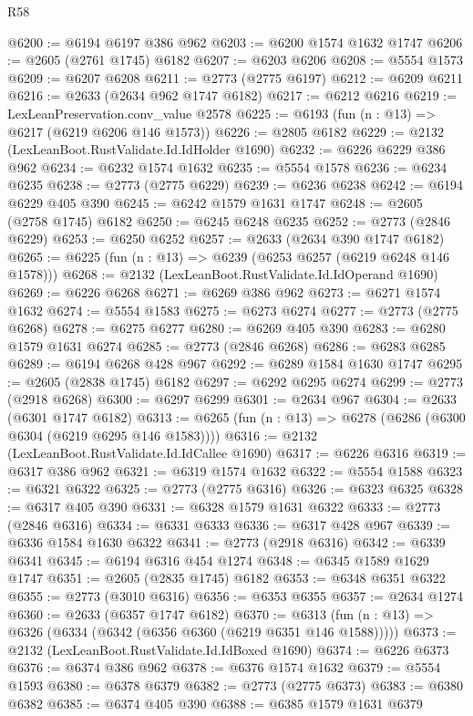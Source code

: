 \begin{lexlean}{R58}
\begin{coremodule}
@6200 := @6194 @6197 @386 @962
@6203 := @6200 @1574 @1632 @1747
@6206 := @2605 (@2761 @1745) @6182
@6207 := @6203 @6206
@6208 := @5554 @1573
@6209 := @6207 @6208
@6211 := @2773 (@2775 @6197)
@6212 := @6209 @6211
@6216 := @2633 (@2634 @962 @1747 @6182)
@6217 := @6212 @6216
@6219 := LexLeanPreservation.conv_value @2578
@6225 := @6193 (fun (n : @13) => @6217 (@6219 @6206 @146 @1573))
@6226 := @2805 @6182
@6229 := @2132 (LexLeanBoot.RustValidate.Id.IdHolder @1690)
@6232 := @6226 @6229 @386 @962
@6234 := @6232 @1574 @1632
@6235 := @5554 @1578
@6236 := @6234 @6235
@6238 := @2773 (@2775 @6229)
@6239 := @6236 @6238
@6242 := @6194 @6229 @405 @390
@6245 := @6242 @1579 @1631 @1747
@6248 := @2605 (@2758 @1745) @6182
@6250 := @6245 @6248 @6235
@6252 := @2773 (@2846 @6229)
@6253 := @6250 @6252
@6257 := @2633 (@2634 @390 @1747 @6182)
@6265 := @6225 (fun (n : @13) => @6239 (@6253 @6257 (@6219 @6248 @146 @1578)))
@6268 := @2132 (LexLeanBoot.RustValidate.Id.IdOperand @1690)
@6269 := @6226 @6268
@6271 := @6269 @386 @962
@6273 := @6271 @1574 @1632
@6274 := @5554 @1583
@6275 := @6273 @6274
@6277 := @2773 (@2775 @6268)
@6278 := @6275 @6277
@6280 := @6269 @405 @390
@6283 := @6280 @1579 @1631 @6274
@6285 := @2773 (@2846 @6268)
@6286 := @6283 @6285
@6289 := @6194 @6268 @428 @967
@6292 := @6289 @1584 @1630 @1747
@6295 := @2605 (@2838 @1745) @6182
@6297 := @6292 @6295 @6274
@6299 := @2773 (@2918 @6268)
@6300 := @6297 @6299
@6301 := @2634 @967
@6304 := @2633 (@6301 @1747 @6182)
@6313 := @6265 (fun (n : @13) => @6278 (@6286 (@6300 @6304 (@6219 @6295 @146 @1583))))
@6316 := @2132 (LexLeanBoot.RustValidate.Id.IdCallee @1690)
@6317 := @6226 @6316
@6319 := @6317 @386 @962
@6321 := @6319 @1574 @1632
@6322 := @5554 @1588
@6323 := @6321 @6322
@6325 := @2773 (@2775 @6316)
@6326 := @6323 @6325
@6328 := @6317 @405 @390
@6331 := @6328 @1579 @1631 @6322
@6333 := @2773 (@2846 @6316)
@6334 := @6331 @6333
@6336 := @6317 @428 @967
@6339 := @6336 @1584 @1630 @6322
@6341 := @2773 (@2918 @6316)
@6342 := @6339 @6341
@6345 := @6194 @6316 @454 @1274
@6348 := @6345 @1589 @1629 @1747
@6351 := @2605 (@2835 @1745) @6182
@6353 := @6348 @6351 @6322
@6355 := @2773 (@3010 @6316)
@6356 := @6353 @6355
@6357 := @2634 @1274
@6360 := @2633 (@6357 @1747 @6182)
@6370 := @6313 (fun (n : @13) => @6326 (@6334 (@6342 (@6356 @6360 (@6219 @6351 @146 @1588)))))
@6373 := @2132 (LexLeanBoot.RustValidate.Id.IdBoxed @1690)
@6374 := @6226 @6373
@6376 := @6374 @386 @962
@6378 := @6376 @1574 @1632
@6379 := @5554 @1593
@6380 := @6378 @6379
@6382 := @2773 (@2775 @6373)
@6383 := @6380 @6382
@6385 := @6374 @405 @390
@6388 := @6385 @1579 @1631 @6379

\end{coremodule}
\end{lexlean}
